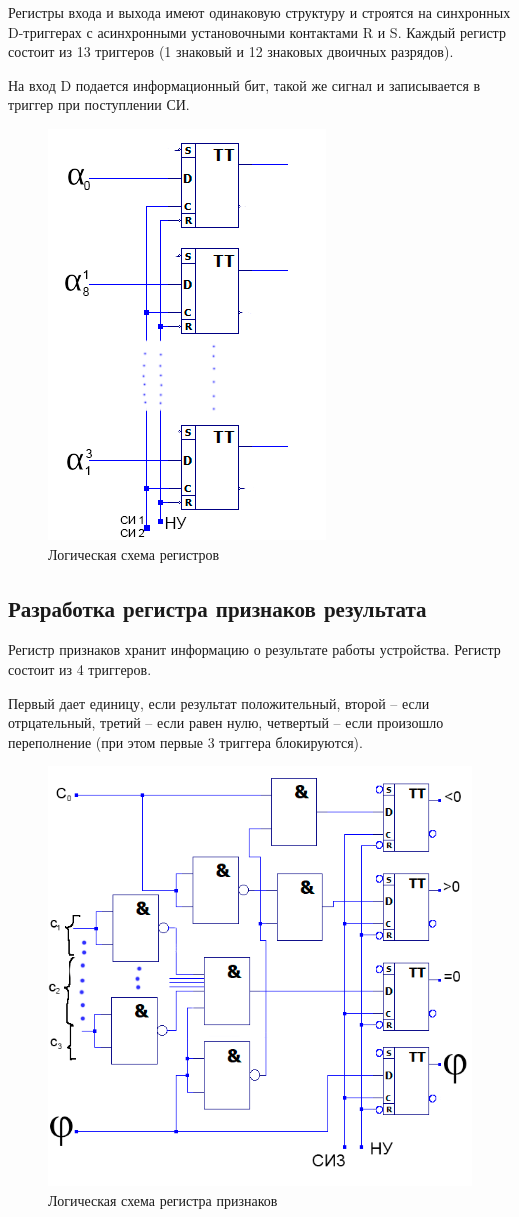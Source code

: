 \documentclass[a4paper,14pt]{article}
\begin{document}
Регистры входа и выхода имеют одинаковую структуру и строятся на синхронных D-триггерах с асинхронными установочными контактами R и S.
Каждый регистр состоит из 13 триггеров (1 знаковый и 12 знаковых двоичных разрядов).

На вход D подается информационный бит, такой же сигнал и записывается в триггер при поступлении СИ.

\begin{figure}[H]
	\centering
	\includegraphics[width=0.5\linewidth]{images/reg}
	\caption{Логическая схема регистров}
	\label{fig:reg}
\end{figure}

\subsection{Разработка регистра признаков результата}

Регистр признаков хранит информацию о результате работы устройства.
Регистр состоит из 4 триггеров.

Первый дает единицу, если результат положительный, второй -- если отрцательный, третий -- если равен нулю, четвертый -- если произошло переполнение (при этом первые 3 триггера блокируются).

\begin{figure}[H]
	\centering
	\includegraphics[width=0.5\linewidth]{images/prizn_sh}
	\caption{Логическая схема регистра признаков}
	\label{fig:prizn_sh}
\end{figure}
\end{document}
